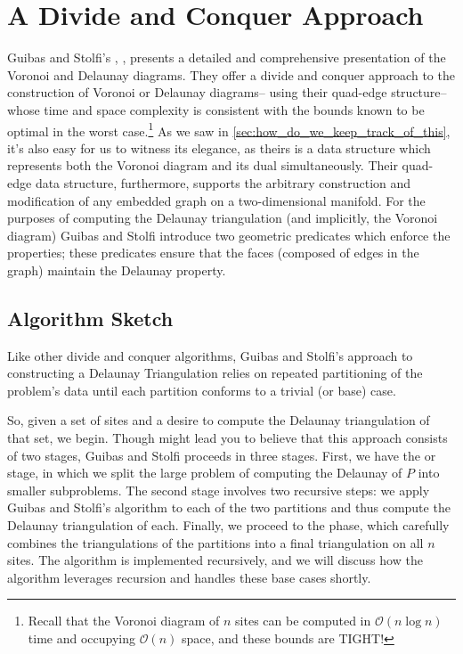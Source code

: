 \documentclass[12pt,twoside]{reedthesis}
\begin{document}
  \section{A Divide and Conquer Approach} %
  \label{sec:divide_and_conquer}
    Guibas and Stolfi's , \citealp{guibas}, presents a detailed and comprehensive presentation of the Voronoi and Delaunay diagrams. They offer a divide and conquer approach to the construction of Voronoi or Delaunay diagrams-- using their quad-edge structure-- whose time and space complexity is consistent with the bounds known to be optimal in the worst case.\footnote{Recall that the Voronoi diagram of $n$ sites can be computed in $\mathcal{O}(n\log n)$ time and occupying $\mathcal{O}(n)$ space, and these bounds are TIGHT!} As we saw in \cref{sec:how_do_we_keep_track_of_this}, it's also easy for us to witness its elegance, as theirs is a data structure which represents both the Voronoi diagram and its dual simultaneously. Their quad-edge data structure, furthermore, supports the arbitrary construction and modification of any embedded graph on a two-dimensional manifold. For the purposes of computing the Delaunay triangulation (and implicitly, the Voronoi diagram)  Guibas and Stolfi introduce two geometric predicates which enforce the  properties; these predicates ensure that the faces (composed of edges in the graph) maintain the Delaunay property.

  \subsection{Algorithm Sketch}
  \label{sub:gs_sketch}
    Like other divide and conquer algorithms, Guibas and Stolfi's approach to constructing a Delaunay Triangulation relies on repeated partitioning of the problem's data until each partition conforms to a trivial (or base) case.

    So, given a set of sites and a desire to compute the Delaunay triangulation of that set, we begin. Though  might lead you to believe that this approach consists of two stages, Guibas and Stolfi proceeds in three stages. First, we have the  or  stage, in which we split the large problem of computing the Delaunay of $P$ into smaller subproblems. The second stage involves two recursive steps: we apply Guibas and Stolfi's algorithm to each of the two partitions and thus compute the Delaunay triangulation of each. Finally, we proceed to the  phase, which carefully combines the triangulations of the partitions into a final triangulation on all $n$ sites. The algorithm is implemented recursively, and we will discuss how the algorithm leverages recursion and handles these base cases shortly. \par
\end{document}
